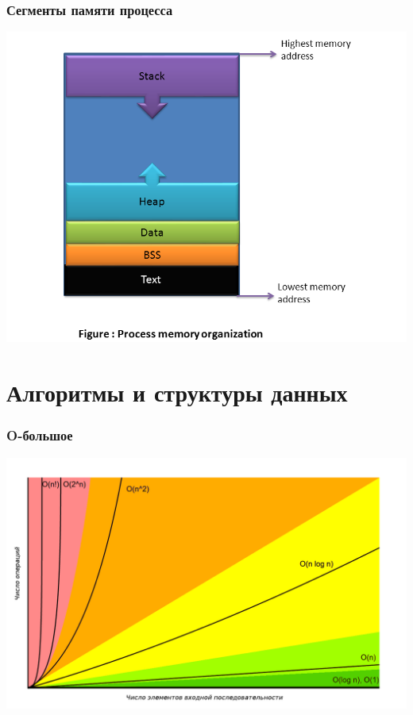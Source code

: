 \documentclass[10pt]{beamer}
\begin{document}
\begin{frame}[fragile]
\frametitle{Сегменты памяти процесса} 
\begin{center}
\includegraphics[width=0.95\linewidth]{images/process_memory_organization.png}
\end{center}
\end{frame}

\section{Алгоритмы и структуры данных}

\begin{frame}[fragile]
\frametitle{O-большое} 
\begin{center}
\includegraphics[width=0.99\linewidth]{images/On.png}
\end{center}
\end{frame}
\end{document}
